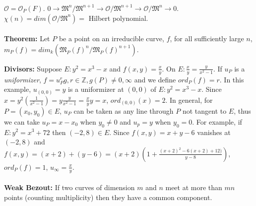 ${\mathcal O}= {\mathcal O}_P(F)$.
$ 0 \rightarrow {\mathfrak M}^n/{\mathfrak M}^{n+1}
\rightarrow {\mathcal O}/{\mathfrak M}^{n+1}
\rightarrow {\mathcal O}/{\mathfrak M}^{n} \rightarrow 0$.
$\chi(n)= dim({\mathcal O}/{\mathfrak M}^n)=$ Hilbert polynomial.  
\\
\\
{\bf Theorem:}  Let $P$ be a point on an irreducible curve, $f$, for all sufficiently
large $n$, $m_P(f)= dim_k({\mathfrak M}_P(f)^n/{\mathfrak M}_P(f)^{n+1})$.
\begin{quote}
\end{quote}
{\bf Divisors:}
Suppose $E: y^2= x^3-x$ and $f(x,y)= {\frac x y}$.  On $E: {\frac x y}= {\frac y {x^2-1}}$.
If $u_P$ is a \emph{uniformizer}, $f= u_P^r g, r \in {\mathbb Z}, g(P) \ne 0, \infty$ and
we define $ord_P(f)=r$.  In this example, $u_{(0,0)}= y$ is a uniformizer at $(0,0)$ of
$E: y^2= x^3-x$.  Since $x= y^2({\frac 1 {x^2-1}})= y {\frac y {x^2-1}}= {\frac x y}y=x$,
$ord_{(0,0)}(x)= 2$.  In general, for $P=(x_0, y_0) \in E$, $u_P$ can be taken as any line
through $P$ not tangent to $E$, thus we can take $u_P= x-x_0$ when $y_0 \ne 0$ and
$u_p= y$ when $y_0=0$.  For example, if $E: y^2= x^3 + 72$ then $(-2, 8) \in E$.
Since $f(x,y)= x+y-6$ vanishes at $(-2,8)$ and
$f(x,y)= (x+2) + (y-6) = (x+2)( 1 + {\frac {(x+2)^2 - 6(x+2) + 12)} {y-8}})$,
$ord_P(f)=1$, $u_{\infty}= {\frac x y}$.
\\
\\
{\bf Weak Bezout:} If two curves of dimension $m$ and $n$ meet at more than $mn$
points (counting multiplicity) then they have a common component.
